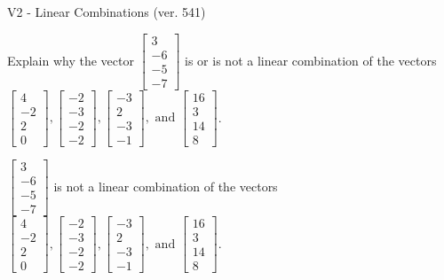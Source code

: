 \begin{exercise}
  \begin{exerciseTitle}V2 - Linear Combinations (ver. 541)\end{exerciseTitle}
  \begin{exerciseStatement}
    Explain why the vector \(\left[\begin{array}{c}
3 \\
-6 \\
-5 \\
-7
\end{array}\right]\)  is or is not a linear 
	combination of the vectors \(\left[\begin{array}{c}
4 \\
-2 \\
2 \\
0
\end{array}\right] , \left[\begin{array}{c}
-2 \\
-3 \\
-2 \\
-2
\end{array}\right] , \left[\begin{array}{c}
-3 \\
2 \\
-3 \\
-1
\end{array}\right] , \text{ and } \left[\begin{array}{c}
16 \\
3 \\
14 \\
8
\end{array}\right]\).
	


  \end{exerciseStatement}
  \begin{exerciseAnswer}
   \(\left[\begin{array}{c}
3 \\
-6 \\
-5 \\
-7
\end{array}\right]\) 
  	 is not  
	a linear combination of the vectors \(\left[\begin{array}{c}
4 \\
-2 \\
2 \\
0
\end{array}\right] , \left[\begin{array}{c}
-2 \\
-3 \\
-2 \\
-2
\end{array}\right] , \left[\begin{array}{c}
-3 \\
2 \\
-3 \\
-1
\end{array}\right] , \text{ and } \left[\begin{array}{c}
16 \\
3 \\
14 \\
8
\end{array}\right]\).


\end{exerciseAnswer}
\end{exercise}
